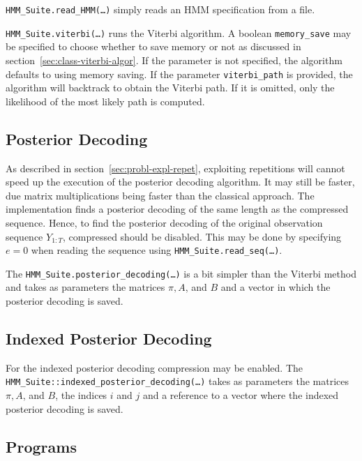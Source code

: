\texttt{HMM\_Suite.read\_HMM(\dots)} simply reads an HMM specification from a
file.

\texttt{HMM\_Suite.viterbi(\dots)} runs the Viterbi algorithm. A boolean
\texttt{memory\_save} may be specified to choose whether to save memory or not
as discussed in section~\ref{sec:class-viterbi-algor}. If the parameter is not
specified, the algorithm defaults to using memory saving. If the parameter
\texttt{viterbi\_path} is provided, the algorithm will backtrack to obtain the
Viterbi path. If it is omitted, only the likelihood of the most likely path is
computed.

\subsection{Posterior Decoding}

As described in section~\ref{sec:probl-expl-repet}, exploiting repetitions will
cannot speed up the execution of the posterior decoding algorithm. It may still
be faster, due matrix multiplications being faster than the classical
approach. The implementation finds a posterior decoding of the same length as
the compressed sequence. Hence, to find the posterior decoding of the original
observation sequence $Y_{1:T}$, compressed should be disabled. This may be done by
specifying $e = 0$ when reading the sequence using
\texttt{HMM\_Suite.read\_seq(\dots)}.

The \texttt{HMM\_Suite.posterior\_decoding(\dots)} is a bit simpler than the
Viterbi method and takes as parameters the matrices $\pi, A$, and $B$ and a
vector in which the posterior decoding is saved.

\subsection{Indexed Posterior Decoding}

For the indexed posterior decoding compression may be enabled. The
\texttt{HMM\_Suite::indexed\_posterior\_decoding(\dots)} takes as parameters the
matrices $\pi, A$, and $B$, the indices $i$ and $j$ and a reference to a vector
where the indexed posterior decoding is saved.

\subsection{Programs}


